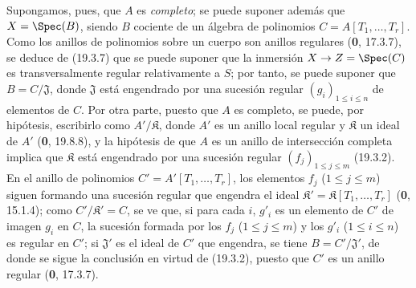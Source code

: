 Supongamos, pues, que $A$ es \emph{completo}; se puede suponer además que $X=\Spec(B)$, siendo $B$ cociente de un álgebra de polinomios $C=A[T_1,\ldots,T_r]$. Como los anillos de polinomios sobre un cuerpo son anillos regulares (\textbf{0}, 17.3.7), se deduce de (19.3.7) que se puede suponer que la inmersión $X\to Z=\Spec(C)$ es transversalmente regular relativamente a $S$; por tanto, se puede suponer que $B=C/\mathfrak J$, donde $\mathfrak J$ está engendrado por una sucesión regular $(g_i)_{1\leq i\leq n}$ de elementos de $C$. Por otra parte, puesto que $A$ es completo, se puede, por hipótesis, escribirlo como $A'/\mathfrak K$, donde $A'$ es un anillo local regular y $\mathfrak K$ un ideal de $A'$ (\textbf{0}, 19.8.8), y la hipótesis de que $A$ es un anillo de intersección completa implica que $\mathfrak K$ está engendrado por una sucesión regular $(f_j)_{1\leq j\leq m}$ (19.3.2). En el anillo de polinomios $C'=A'[T_1,\ldots,T_r]$, los elementos $f_j$ ($1\leq j\leq m$) siguen formando una sucesión regular que engendra el ideal $\mathfrak K'=\mathfrak K[T_1,\ldots,T_r]$ (\textbf{0}, 15.1.4); como $C'/\mathfrak K'=C$, se ve que, si para cada $i$, $g'_i$ es un elemento de $C'$ de imagen $g_i$ en $C$, la sucesión formada por los $f_j$ ($1\leq j\leq m$) y los $g'_i$ ($1\leq i\leq n$) es regular en $C'$; si $\mathfrak J'$ es el ideal de $C'$ que engendra, se tiene $B=C'/\mathfrak J'$, de donde se sigue la conclusión en virtud de (19.3.2), puesto que $C'$ es un anillo regular (\textbf{0}, 17.3.7).
